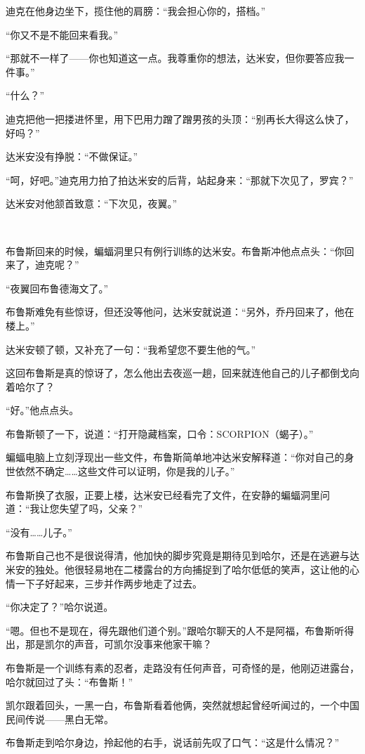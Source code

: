 \documentclass[../main]{subfiles}
\begin{document}
迪克在他身边坐下，揽住他的肩膀：“我会担心你的，搭档。”

“你又不是不能回来看我。”

“那就不一样了——你也知道这一点。我尊重你的想法，达米安，但你要答应我一件事。”

“什么？”

迪克把他一把搂进怀里，用下巴用力蹭了蹭男孩的头顶：“别再长大得这么快了，好吗？”

达米安没有挣脱：“不做保证。”

“呵，好吧。”迪克用力拍了拍达米安的后背，站起身来：“那就下次见了，罗宾？”

达米安对他颔首致意：“下次见，夜翼。”

~\

布鲁斯回来的时候，蝙蝠洞里只有例行训练的达米安。布鲁斯冲他点点头：“你回来了，迪克呢？”

“夜翼回布鲁德海文了。”

布鲁斯难免有些惊讶，但还没等他问，达米安就说道：“另外，乔丹回来了，他在楼上。”

达米安顿了顿，又补充了一句：“我希望您不要生他的气。”

这回布鲁斯是真的惊讶了，怎么他出去夜巡一趟，回来就连他自己的儿子都倒戈向着哈尔了？

“好。”他点点头。

布鲁斯顿了一下，说道：“打开隐藏档案，口令：SCORPION（蝎子）。”

蝙蝠电脑上立刻浮现出一些文件，布鲁斯简单地冲达米安解释道：“你对自己的身世依然不确定……这些文件可以证明，你是我的儿子。”

布鲁斯换了衣服，正要上楼，达米安已经看完了文件，在安静的蝙蝠洞里问道：“我让您失望了吗，父亲？”

“没有……儿子。”

布鲁斯自己也不是很说得清，他加快的脚步究竟是期待见到哈尔，还是在逃避与达米安的独处。他很轻易地在二楼露台的方向捕捉到了哈尔低低的笑声，这让他的心情一下子好起来，三步并作两步地走了过去。

“你决定了？”哈尔说道。

“嗯。但也不是现在，得先跟他们道个别。”跟哈尔聊天的人不是阿福，布鲁斯听得出，那是凯尔的声音，可凯尔没事来他家干嘛？

布鲁斯是一个训练有素的忍者，走路没有任何声音，可奇怪的是，他刚迈进露台，哈尔就回过了头：“布鲁斯！”

凯尔跟着回头，一黑一白，布鲁斯看着他俩，突然就想起曾经听闻过的，一个中国民间传说——黑白无常。

布鲁斯走到哈尔身边，拎起他的右手，说话前先叹了口气：“这是什么情况？”
\end{document}
